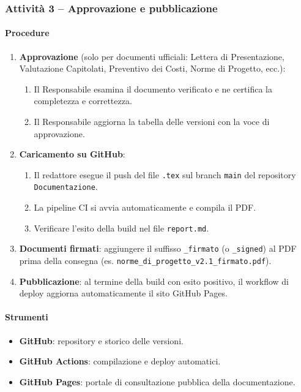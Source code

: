 \documentclass[a4paper, 11pt, oneside]{scrartcl}
\begin{document}
\subsubsection{Attività 3 – Approvazione e pubblicazione}

\paragraph{Procedure}
\begin{enumerate}
    \item \textbf{Approvazione} (solo per documenti ufficiali: Lettera di Presentazione, Valutazione Capitolati, Preventivo dei Costi, Norme di Progetto, ecc.):
          \begin{enumerate}[label=\alph*.]
              \item Il Responsabile esamina il documento verificato e ne certifica la completezza e correttezza.
              \item Il Responsabile aggiorna la tabella delle versioni con la voce di approvazione.
          \end{enumerate}
    \item \textbf{Caricamento su GitHub}:
          \begin{enumerate}[label=\alph*.]
              \item Il redattore esegue il push del file \texttt{.tex} sul branch \texttt{main} del repository \texttt{Documentazione}.
              \item La pipeline CI si avvia automaticamente e compila il PDF.
              \item Verificare l'esito della build nel file \texttt{report.md}.
          \end{enumerate}
    \item \textbf{Documenti firmati}: aggiungere il suffisso \texttt{\_firmato} (o \texttt{\_signed}) al PDF prima della consegna (es. \texttt{norme\_di\_progetto\_v2.1\_firmato.pdf}).
    \item \textbf{Pubblicazione}: al termine della build con esito positivo, il workflow di deploy aggiorna automaticamente il sito GitHub Pages.
\end{enumerate}

\paragraph{Strumenti}
\begin{itemize}
    \item \textbf{GitHub}: repository e storico delle versioni.
    \item \textbf{GitHub Actions}: compilazione e deploy automatici.
    \item \textbf{GitHub Pages}: portale di consultazione pubblica della documentazione.
\end{itemize}
\end{document}

